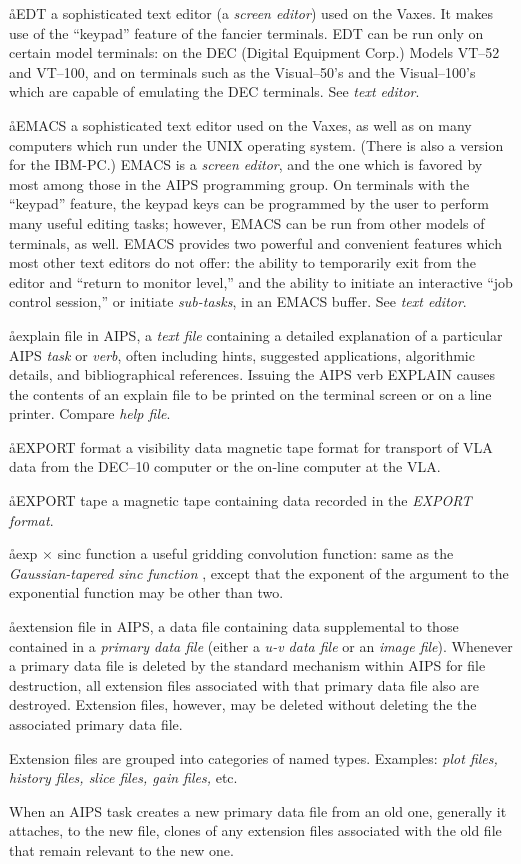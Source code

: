 \aa{EDT}
a sophisticated text editor (a {\it screen editor}) used on the
Vaxes.
It makes use of the ``keypad'' feature of the fancier terminals.
EDT can be run only on certain model terminals:
on the DEC (Digital Equipment Corp.) Models VT--52
and VT--100, and on terminals such as the Visual--50's and the
Visual--100's which are capable of emulating the DEC terminals.
See {\it text editor}.

\aa{EMACS}
a sophisticated text editor used on the Vaxes, as
well as on many computers which run under the UNIX operating system.
(There is also a version for the IBM-PC.)
EMACS is a {\it screen editor}, and the one which is favored by
most among those in the AIPS programming group.
On terminals with the ``keypad'' feature, the keypad keys
can be programmed by the user to perform many useful editing tasks;
however, EMACS can be run from other models of terminals, as well.
EMACS provides two powerful and convenient features which most
other text editors do not offer:
the ability to temporarily exit from the editor and ``return to
monitor level,''
and the ability to initiate an interactive ``job control session,''
or initiate {\it sub-tasks}, in an EMACS buffer.
See {\it text editor}.

\aa{explain file}
in AIPS, a {\it text file} containing a detailed explanation of a
particular AIPS {\it task} or {\it verb}, often including
hints, suggested applications, algorithmic details,
and bibliographical references.
Issuing the AIPS verb EXPLAIN causes the contents of an
explain file to be printed on the terminal screen or on a line printer.
Compare {\it help file}.

\aa{EXPORT format}
a visibility data magnetic tape format for transport of
VLA data from the DEC--10 computer or the on-line computer at the VLA.

\aa{EXPORT tape}
a magnetic tape containing data recorded in the {\it EXPORT format}.

\aa{exp $\times$ sinc function}
a useful gridding convolution function:
same as the {\it Gaussian-tapered sinc function} \qv,
except that the exponent of the argument to the exponential function
may be other than two.

\aa{extension file}
in AIPS, a data file containing data supplemental to those
contained in a {\it primary data file} (either a {\it u-v data file}
or an {\it image file}).
Whenever a primary data file is deleted by the standard
mechanism within AIPS for file destruction, all extension
files associated with that primary data file also are destroyed.
Extension files, however, may be deleted without deleting the
the associated primary data file.
\par
Extension files are grouped into categories of named types.
Examples: {\it plot files, history files, slice files, gain files,}
etc.
\par
When an AIPS task creates a new primary data file from an old one,
generally it attaches, to the new file, clones of any extension
files associated with the old file that remain relevant to the
new one.

